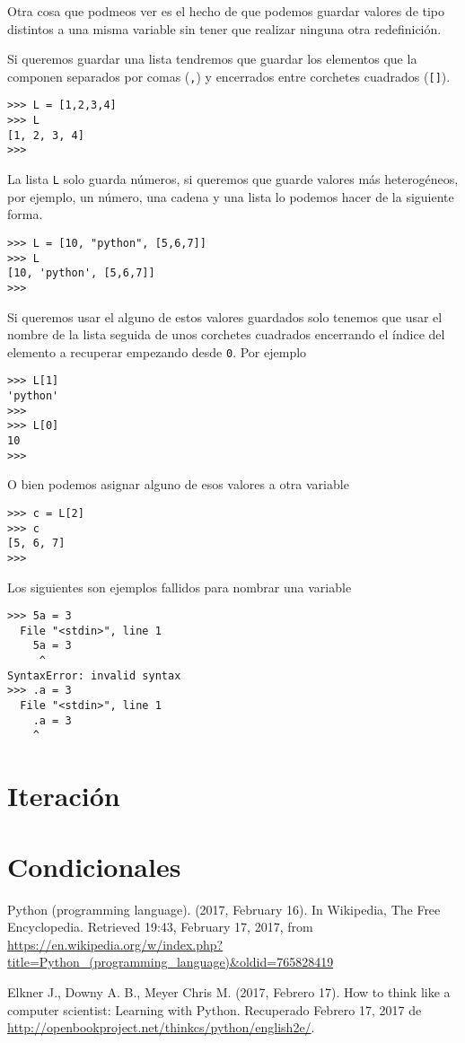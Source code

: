 \documentclass{report}
\begin{document}
Otra cosa que podmeos ver es el hecho de que podemos guardar valores de tipo 
distintos a una misma variable sin tener que realizar ninguna otra 
redefinición.

Si queremos guardar una lista tendremos que guardar los elementos que la 
componen separados por comas ({\tt{,}}) y encerrados entre corchetes cuadrados
({\tt{[]}}). 

\begin{verbatim}
>>> L = [1,2,3,4]
>>> L
[1, 2, 3, 4]
>>> 
\end{verbatim}

La lista {\tt{L}} solo guarda números, si queremos que guarde valores más 
heterogéneos, por ejemplo, un número, una cadena y una lista lo podemos hacer
de la siguiente forma.

\begin{verbatim}
>>> L = [10, "python", [5,6,7]]
>>> L
[10, 'python', [5,6,7]]
>>> 
\end{verbatim}

Si queremos usar el alguno de estos valores guardados solo tenemos que usar
el nombre de la lista seguida de unos corchetes cuadrados encerrando el índice
del elemento a recuperar empezando desde {\tt{0}}. Por ejemplo

\begin{verbatim}
>>> L[1]
'python'
>>>
>>> L[0]
10
>>>
\end{verbatim}

O bien podemos asignar alguno de esos valores a otra variable

\begin{verbatim}
>>> c = L[2]
>>> c
[5, 6, 7]
>>>
\end{verbatim}

Los siguientes son ejemplos fallidos para nombrar una variable

\begin{verbatim}
>>> 5a = 3
  File "<stdin>", line 1
    5a = 3
     ^
SyntaxError: invalid syntax
>>> .a = 3
  File "<stdin>", line 1
    .a = 3
    ^
\end{verbatim}

\section{Iteración}

\section{Condicionales}

\begin{thebibliography}{9}

Python (programming language). (2017, February 16). In Wikipedia, The Free
Encyclopedia. Retrieved 19:43, February 17, 2017, from 
\url{https://en.wikipedia.org/w/index.php?title=Python_(programming_language)&oldid=765828419}

Elkner J., Downy A. B., Meyer Chris M. (2017, Febrero 17). 
How to think like a computer scientist: Learning with Python. 
Recuperado Febrero 17, 2017 de 
\url{http://openbookproject.net/thinkcs/python/english2e/}. 

\end{thebibliography}
\end{document}
